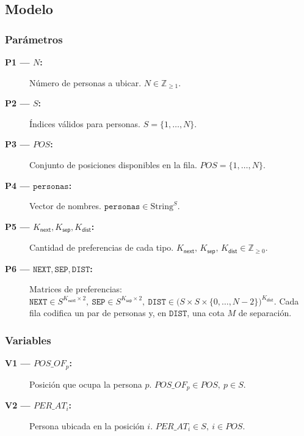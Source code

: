 
\subsection{Modelo}\label{sec:05-reunion-modelo}
\subsubsection*{Parámetros}
\begin{description}
  \item[\textbf{P1 — \(N\):}] Número de personas a ubicar. \(N\in\mathbb{Z}_{\ge 1}.\)
  \item[\textbf{P2 — \(S\):}] Índices válidos para personas. \(S=\{1,\dots,N\}.\)
  \item[\textbf{P3 — \(POS\):}] Conjunto de posiciones disponibles en la fila. \(POS=\{1,\dots,N\}.\)
  \item[\textbf{P4 — \(\texttt{personas}\):}] Vector de nombres. \(\texttt{personas}\in \text{String}^{S}.\)
  \item[\textbf{P5 — \(K_{\textsf{next}}, K_{\textsf{sep}}, K_{\textsf{dist}}\):}] Cantidad de preferencias de cada tipo. \(K_{\textsf{next}},\,K_{\textsf{sep}},\,K_{\textsf{dist}}\in\mathbb{Z}_{\ge 0}.\)
  \item[\textbf{P6 — \(\texttt{NEXT},\texttt{SEP},\texttt{DIST}\):}] Matrices de preferencias: \(\texttt{NEXT}\in S^{K_{\textsf{next}}\times 2},\ \texttt{SEP}\in S^{K_{\textsf{sep}}\times 2},\ \texttt{DIST}\in \big(S\times S\times \{0,\dots,N-2\}\big)^{K_{\textsf{dist}}}.\) Cada fila codifica un par de personas y, en \(\texttt{DIST}\), una cota \(M\) de separación.
\end{description}
\subsubsection*{Variables}
\begin{description}
  \item[\textbf{V1 — \(POS\_OF_p\):}] Posición que ocupa la persona \(p\). \(POS\_OF_p\in POS,\ p\in S.\)
  \item[\textbf{V2 — \(PER\_AT_i\):}] Persona ubicada en la posición \(i\). \(PER\_AT_i\in S,\ i\in POS.\)
\end{description}
